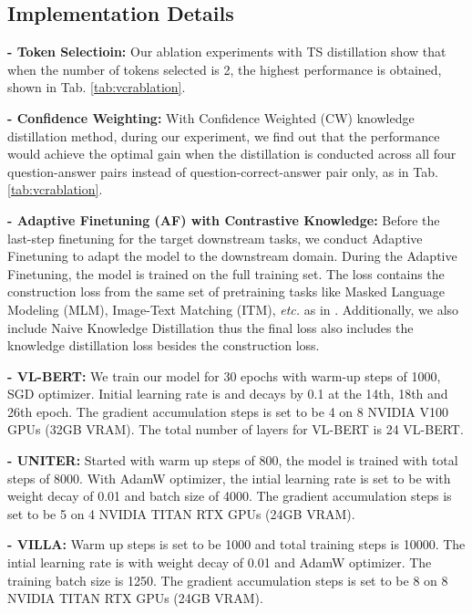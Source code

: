 \documentclass[runningheads]{llncs}
\begin{document}
\subsection{Implementation Details}
\label{sec:trainingdetails-implementation}

\noindent\textbf{- Token Selectioin: } Our ablation experiments with TS distillation show that when the number of tokens selected is 2, the highest performance is obtained, shown in Tab. \ref{tab:vcrablation}.

\noindent\textbf{- Confidence Weighting:} With Confidence Weighted (CW) knowledge distillation method, during our experiment, we find out that the performance would achieve the optimal gain when the distillation is conducted across all four question-answer pairs instead of question-correct-answer pair only, as in Tab. \ref{tab:vcrablation}.

\noindent\textbf{- Adaptive Finetuning (AF) with Contrastive Knowledge:} Before the last-step finetuning for the target downstream tasks, we conduct Adaptive Finetuning to adapt the model to the downstream domain. During the Adaptive Finetuning, the model is trained on the full training set. The loss contains the construction loss from the same set of pretraining tasks like Masked Language Modeling (MLM), Image-Text Matching (ITM), \textit{etc.} as in \cite{chen2020uniter}. Additionally, we also include Naive Knowledge Distillation thus the final loss also includes the knowledge distillation loss besides the construction loss.

\noindent\textbf{- VL-BERT: } We train our model for 30 epochs with warm-up steps of 1000, SGD optimizer. Initial learning rate is  and  decays by 0.1 at the 14th, 18th and 26th epoch. The gradient accumulation steps is set to be 4 on 8 NVIDIA V100 GPUs (32GB VRAM). The total number of layers for VL-BERT is 24 VL-BERT.

\noindent\textbf{- UNITER: }  Started with warm up steps of 800, the model is trained with total steps of 8000. With AdamW optimizer, the intial learning rate is set to be  with weight decay of 0.01 and batch size of 4000. The gradient accumulation steps is set to be 5 on 4 NVIDIA TITAN RTX GPUs (24GB VRAM).

\noindent\textbf{- VILLA: } Warm up steps is set to be 1000 and total training steps is 10000. The intial learning rate is  with weight decay of 0.01 and AdamW optimizer. The training batch size is 1250. The gradient accumulation steps is set to be 8 on 8 NVIDIA TITAN RTX GPUs (24GB VRAM).
\end{document}
